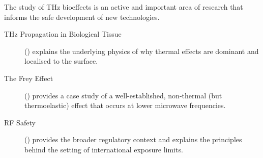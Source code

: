 \begin{importantbox}[title={Further Reading}]
    The study of THz bioeffects is an active and important area of research that informs the safe development of new technologies.
    \begin{description}
        \item[THz Propagation in Biological Tissue] () explains the underlying physics of why thermal effects are dominant and localised to the surface.
        \item[The Frey Effect] () provides a case study of a well-established, non-thermal (but thermoelastic) effect that occurs at lower microwave frequencies.
        \item[RF Safety] () provides the broader regulatory context and explains the principles behind the setting of international exposure limits.
    \end{description}
\end{importantbox}